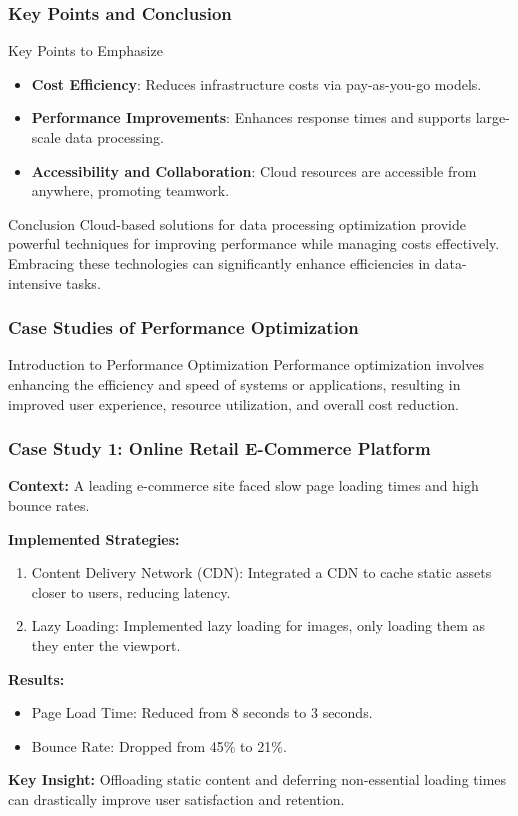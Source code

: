 \documentclass[aspectratio=169]{beamer}
\begin{document}
\begin{frame}[fragile]
    \frametitle{Key Points and Conclusion}
    \begin{block}{Key Points to Emphasize}
        \begin{itemize}
            \item \textbf{Cost Efficiency}: Reduces infrastructure costs via pay-as-you-go models.
            \item \textbf{Performance Improvements}: Enhances response times and supports large-scale data processing.
            \item \textbf{Accessibility and Collaboration}: Cloud resources are accessible from anywhere, promoting teamwork.
        \end{itemize}
    \end{block}
    
    \begin{block}{Conclusion}
        Cloud-based solutions for data processing optimization provide powerful techniques for improving 
        performance while managing costs effectively. Embracing these technologies can significantly enhance 
        efficiencies in data-intensive tasks.
    \end{block}
\end{frame}

\begin{frame}[fragile]
    \frametitle{Case Studies of Performance Optimization}
    \begin{block}{Introduction to Performance Optimization}
        Performance optimization involves enhancing the efficiency and speed of systems or applications, resulting in improved user experience, resource utilization, and overall cost reduction.
    \end{block}
\end{frame}

\begin{frame}[fragile]
    \frametitle{Case Study 1: Online Retail E-Commerce Platform}
    \textbf{Context:} A leading e-commerce site faced slow page loading times and high bounce rates.
    
    \textbf{Implemented Strategies:}
    \begin{enumerate}
        \item Content Delivery Network (CDN): Integrated a CDN to cache static assets closer to users, reducing latency.
        \item Lazy Loading: Implemented lazy loading for images, only loading them as they enter the viewport.
    \end{enumerate}
    
    \textbf{Results:}
    \begin{itemize}
        \item Page Load Time: Reduced from 8 seconds to 3 seconds.
        \item Bounce Rate: Dropped from 45\% to 21\%.
    \end{itemize}
    
    \textbf{Key Insight:} Offloading static content and deferring non-essential loading times can drastically improve user satisfaction and retention.
\end{frame}
\end{document}
